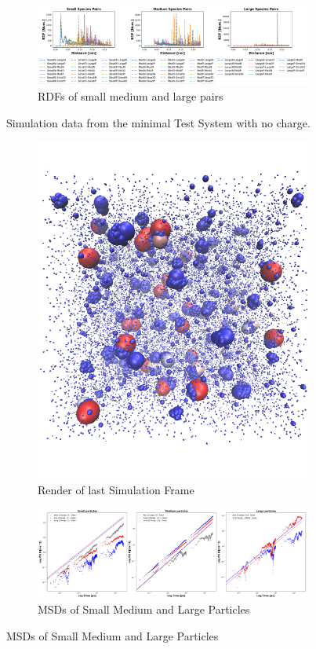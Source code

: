 \documentclass[draft, english]{volcanica-template}
\begin{document}
\begin{figure}[!htbp]
\begin{figure}[!htbp]
\centering
\includegraphics[width=0.7\linewidth]{files/Pairwise_RDFs_ij-d6ee9f07154673f560979575ab373c4a.png}
\caption[]{RDFs of small medium and large pairs}
\label{Fig7_NoQTestSys-d}
\end{figure}
\caption[]{Simulation data from the minimal Test System with no charge.}
\label{Fig7_NoQTestSys-d}
\end{figure}

\begin{figure}[!htbp]
\centering
\begin{figure}[!htbp]
\centering
\includegraphics[width=0.7\linewidth]{files/ChargeRender-468ec6f8a22c2aa5aa7249c8b9821a74.png}
\caption[]{Render of last Simulation Frame}
\label{Fig8_CytoSys}
\end{figure}

\begin{figure}[!htbp]
\centering
\includegraphics[width=0.7\linewidth]{files/Combined_MSD-ffee744e2bf7b87ed71936f5272207b0.png}
\caption[]{MSDs of Small Medium and Large Particles}
\label{Fig8_CytoSys-b}
\end{figure}


\end{figure}
\end{document}
